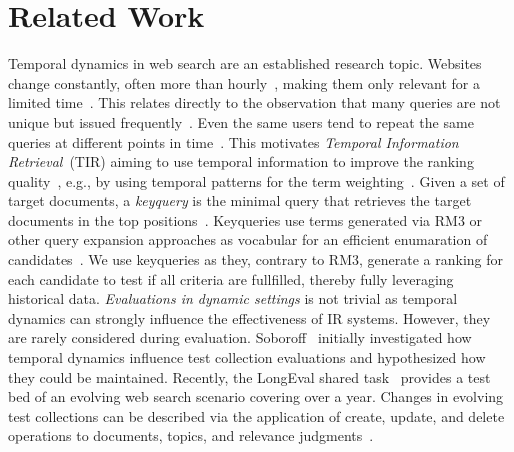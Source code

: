 \section{Related Work}
\label{sec:related-work}

Temporal dynamics in web search are an established research topic. Websites change constantly, often more than hourly~\cite{DBLP:conf/wsdm/AdarTDE09}, making them only relevant for a limited time~\cite{DBLP:conf/sigir/TikhonovBBOKG13}. This relates directly to the observation that many queries are not unique but issued frequently~\cite{DBLP:conf/sigir/Dumais14,DBLP:journals/sigir/SilversteinHMM99}. Even the same users tend to repeat the same queries at different points in time~\cite{DBLP:conf/wsdm/TylerT10}.
This motivates \emph{Temporal Information Retrieval}~(TIR) aiming to use temporal information to improve the ranking quality~\cite{DBLP:journals/ftir/KanhabuaBN15,DBLP:journals/csur/CamposDJJ14}, e.g., by using temporal patterns for the term weighting~\cite{DBLP:conf/wsdm/ElsasD10}.
Given a set of target documents, a \emph{keyquery} is the minimal query that retrieves the target documents in the top positions~\cite{gollub:2013a,hagen:2016b}. Keyqueries use terms generated via RM3 or other query expansion approaches as vocabular for an efficient enumaration of candidates~\cite{froebe:2022c,froebe:2021c}. We use keyqueries as they, contrary to RM3, generate a ranking for each candidate to test if all criteria are fullfilled, thereby fully leveraging historical data.
\emph{Evaluations in dynamic settings} is not trivial as temporal dynamics can strongly influence the effectiveness of IR systems. However, they are rarely  considered during evaluation. Soboroff~\cite{DBLP:conf/sigir/Soboroff06} initially investigated how temporal dynamics influence test collection evaluations and hypothesized how they could be maintained. Recently, the LongEval shared task~\cite{alkhalifa:2023,DBLP:conf/clef/AlkhalifaBDEAFG24} provides a test bed of an evolving web search scenario covering over a year. Changes in evolving test collections can be described via the application of create, update, and delete operations to documents, topics, and relevance judgments~\cite{keller:2024}.

